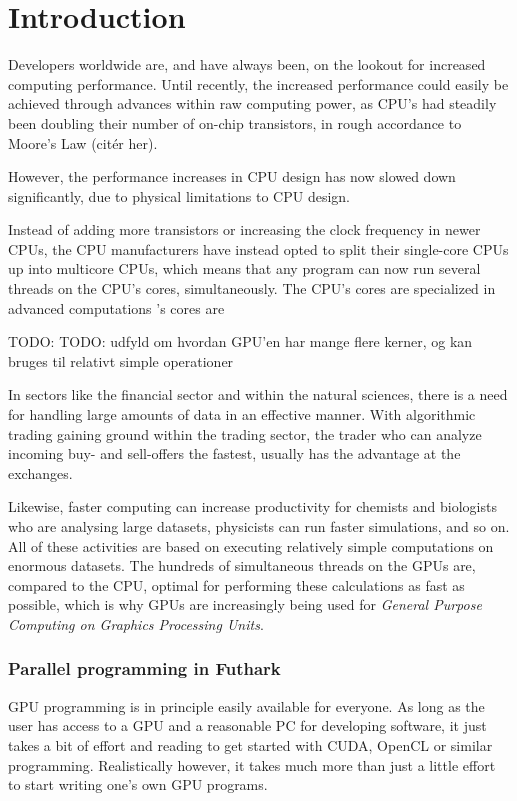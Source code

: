 \chapter{Introduction}
Developers worldwide are, and have always been, on the lookout for increased
computing performance.
Until recently, the increased performance could easily be
achieved through advances within raw computing power, as CPU's had steadily been
doubling their number of on-chip transistors, in rough accordance to Moore's Law (citér
her).

However, the performance increases in CPU design has now slowed down
significantly, due to physical limitations to CPU design.

Instead of adding more transistors or increasing the clock frequency in newer
CPUs, the CPU manufacturers have instead opted to split their single-core CPUs
up into multicore CPUs, which means that any program can now run several threads
on the CPU's cores, simultaneously.
The CPU's cores are specialized in advanced computations 
's cores are 

TODO: TODO:
 udfyld om hvordan GPU'en har mange flere kerner, og kan bruges til relativt
 simple operationer 

In sectors like the financial sector and within the natural sciences, there is a
need for handling large amounts of data in an effective manner. With algorithmic
trading gaining ground within the trading sector, the trader who can analyze
incoming buy- and sell-offers the fastest, usually has the advantage at the
exchanges.

Likewise, faster computing can increase productivity for chemists and
biologists who are analysing large datasets, physicists can run faster
simulations, and so on.
All of these activities are based on executing relatively simple computations on enormous datasets.
The hundreds of simultaneous threads on the GPUs are, compared to the CPU,
optimal for performing these calculations as fast as possible,
which is why GPUs are increasingly being used for \textit{General Purpose
  Computing on Graphics Processing Units}.

\subsection*{Parallel programming in Futhark}
GPU programming is in principle easily available for everyone. As long as the user has access
to a GPU and a reasonable PC for developing software, it just takes a bit of
effort and reading to get started with CUDA, OpenCL or similar programming.
Realistically however, it takes much more than just a little effort to start writing
one's own GPU programs.

